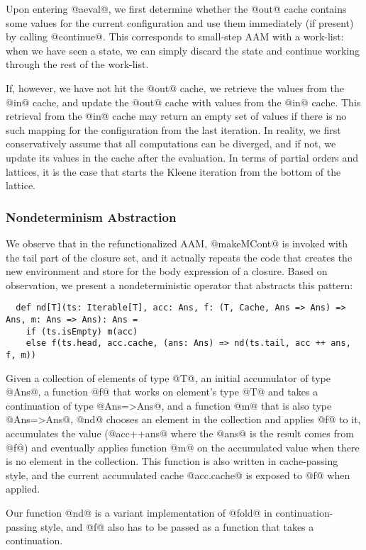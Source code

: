 \documentclass[acmsmall, review]{acmart}\settopmatter{}
\begin{document}
Upon entering @aeval@, we first determine whether the @out@ cache contains some values 
for the current configuration and use them immediately (if present) by calling @continue@.
This corresponds to small-step AAM with a work-list: when we have seen a state,
we can simply discard the state and continue working through the rest of the work-list.

If, however, we have not hit the @out@ cache, we retrieve the values from the @in@ cache, 
and update the @out@ cache with values from the @in@ cache. This retrieval from the @in@ 
cache may return an empty set of values if there is no such mapping for the configuration 
from the last iteration.
In reality, we first conservatively assume that all computations can be diverged, and if 
not, we update its values in the cache after the evaluation. In terms of partial orders and 
lattices, it is the case that starts the Kleene iteration from the bottom of the lattice.

\subsubsection{Nondeterminism Abstraction}
We observe that in the refunctionalized AAM, @makeMCont@ is invoked with the tail part of
the closure set, and it actually repeats the code that creates the new environment and 
store for the body expression of a closure.
Based on observation, we present a nondeterministic operator that abstracts this pattern:

\begin{lstlisting}
  def nd[T](ts: Iterable[T], acc: Ans, f: (T, Cache, Ans => Ans) => Ans, m: Ans => Ans): Ans =
    if (ts.isEmpty) m(acc)
    else f(ts.head, acc.cache, (ans: Ans) => nd(ts.tail, acc ++ ans, f, m))
\end{lstlisting}

Given a collection of elements of type @T@, an initial accumulator of type 
@Ans@, a function @f@ that works on element's type @T@ and takes a continuation 
of type @Ans=>Ans@, and a function @m@ that is also type @Ans=>Ans@, @nd@ chooses
an element in the collection and applies @f@ to it, accumulates the value 
(@acc++ans@ where the @ans@ is the result comes from @f@) and eventually applies 
function @m@ on the accumulated value when there is no element in the collection.
This function is also written in cache-passing style, and the current accumulated 
cache @acc.cache@ is exposed to @f@ when applied.

Our function @nd@ is a variant implementation of @fold@ in continuation-passing style,
and @f@ also has to be passed as a function that takes a continuation.
\end{document}
